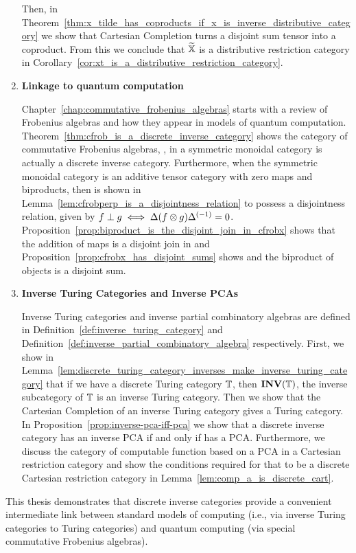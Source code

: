 \begin{enumerate}
Then, in Theorem~\ref{thm:x_tilde_has_coproducts_if_x_is_inverse_distributive_category} we show that
Cartesian Completion turns a disjoint sum tensor into a coproduct. From this we conclude that $\widetilde{\mathbb{X}}$
is a distributive restriction category in
Corollary~\ref{cor:xt_is_a_distributive_restriction_category}.

\item \textbf{Linkage to quantum computation}

Chapter~\ref{chap:commutative_frobenius_algebras} starts with a review of Frobenius algebras and how
they appear in models of quantum computation. Theorem~\ref{thm:cfrob_is_a_discrete_inverse_category}
shows the category of commutative Frobenius algebras, \CFrob, in a symmetric monoidal category \X
is actually a discrete inverse category. Furthermore, when the symmetric monoidal category \X is an
additive tensor category with zero maps and biproducts, then \CFrob is shown in
Lemma~\ref{lem:cfrobperp_is_a_disjointness_relation} to possess a disjointness relation, given by
$f\perp g \iff \Delta(f\otimes g){\Delta}^{(-1)} =
0$. Proposition~\ref{prop:biproduct_is_the_disjoint_join_in_cfrobx} shows that the addition of maps
is a disjoint join in \CFrob and Proposition~\ref{prop:cfrobx_has_disjoint_sums} shows and the
biproduct of objects is a disjoint sum.

\item \textbf{Inverse Turing Categories and Inverse PCAs}

Inverse Turing categories and inverse partial combinatory algebras are defined in
Definition~\ref{def:inverse_turing_category} and
Definition~\ref{def:inverse_partial_combinatory_algebra} respectively. First, we show in
Lemma~\ref{lem:discrete_turing_category_inverses_make_inverse_turing_category} that if we have a
discrete Turing category $\mathbb{T}$, then $\mathbf{INV}({\mathbb{T}})$, the inverse subcategory of $\mathbb{T}$ is an inverse Turing
category. Then we show that the Cartesian Completion of an inverse Turing category gives a Turing
category. In Proposition~\ref{prop:inverse-pca-iff-pca} we show that a discrete inverse category \X
has an inverse PCA if and only if \Xt has a PCA. Furthermore, we discuss the category of computable
function based on a PCA in a Cartesian restriction category and show the conditions required for
that to be a discrete Cartesian restriction category in Lemma~\ref{lem:comp_a_is_discrete_cart}.
\end{enumerate}

This thesis demonstrates that discrete inverse categories provide a convenient intermediate link
between standard models of computing (i.e., via inverse Turing categories to Turing categories) and
quantum computing (via special commutative Frobenius algebras).


